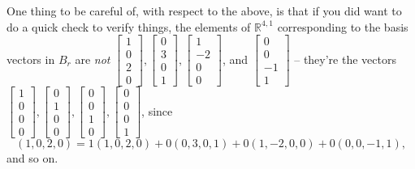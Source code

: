 \documentclass[12pt]{article}
\newcommand{\R}{\mathbb{R}}
\begin{document}
One thing to be careful of, with respect to the above, is that if you did want to do a quick check to verify things, the elements of $\R^{4,1}$ corresponding to the basis vectors in $B_r$ are {\em not} $\begin{bmatrix}1\\0\\2\\0\end{bmatrix}, \begin{bmatrix}0\\3\\0\\1\end{bmatrix}, \begin{bmatrix}1\\-2\\0\\0\end{bmatrix}$, and $\begin{bmatrix}0\\0\\-1\\1\end{bmatrix}$ -- they're the vectors $\begin{bmatrix}1\\0\\0\\0\end{bmatrix}, \begin{bmatrix}0\\1\\0\\0\end{bmatrix}, \begin{bmatrix}0\\0\\1\\0\end{bmatrix}, \begin{bmatrix}0\\0\\0\\1\end{bmatrix}$, since
\[
 (1,0,2,0) = 1(1,0,2,0)+0(0,3,0,1)+0(1,-2,0,0)+0(0,0,-1,1),
\]
and so on.
\end{document}
